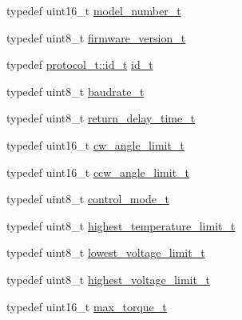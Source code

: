 \begin{DoxyCompactItemize}
\item 
typedef uint16\+\_\+t \hyperlink{structdynamixel_1_1servos_1_1_model_traits_3_01_xl320_01_4_1_1_c_t_aacfc8eec67dfec7e83d7aebcfad8caf7}{model\+\_\+number\+\_\+t}
\item 
typedef uint8\+\_\+t \hyperlink{structdynamixel_1_1servos_1_1_model_traits_3_01_xl320_01_4_1_1_c_t_a09705200b7923d6290e1887f57583610}{firmware\+\_\+version\+\_\+t}
\item 
typedef \hyperlink{classdynamixel_1_1protocols_1_1_protocol2_a38d9cae72cd86213cca74e718c240429}{protocol\+\_\+t\+::id\+\_\+t} \hyperlink{structdynamixel_1_1servos_1_1_model_traits_3_01_xl320_01_4_1_1_c_t_a7198088e049557b59ff1ace206a593be}{id\+\_\+t}
\item 
typedef uint8\+\_\+t \hyperlink{structdynamixel_1_1servos_1_1_model_traits_3_01_xl320_01_4_1_1_c_t_a7404f29aac21de1cb5357b23dc06e82d}{baudrate\+\_\+t}
\item 
typedef uint8\+\_\+t \hyperlink{structdynamixel_1_1servos_1_1_model_traits_3_01_xl320_01_4_1_1_c_t_a11370bf1ecea307f9f5ffbbcff181c64}{return\+\_\+delay\+\_\+time\+\_\+t}
\item 
typedef uint16\+\_\+t \hyperlink{structdynamixel_1_1servos_1_1_model_traits_3_01_xl320_01_4_1_1_c_t_a319479d6017a4430b9e05e378de557e0}{cw\+\_\+angle\+\_\+limit\+\_\+t}
\item 
typedef uint16\+\_\+t \hyperlink{structdynamixel_1_1servos_1_1_model_traits_3_01_xl320_01_4_1_1_c_t_a09dffdec3328d3c045ff12373b25d895}{ccw\+\_\+angle\+\_\+limit\+\_\+t}
\item 
typedef uint8\+\_\+t \hyperlink{structdynamixel_1_1servos_1_1_model_traits_3_01_xl320_01_4_1_1_c_t_a563172c7945c1ac77119e6c76d3adc60}{control\+\_\+mode\+\_\+t}
\item 
typedef uint8\+\_\+t \hyperlink{structdynamixel_1_1servos_1_1_model_traits_3_01_xl320_01_4_1_1_c_t_a7dc8c5d096a90b9afc2000931d020af2}{highest\+\_\+temperature\+\_\+limit\+\_\+t}
\item 
typedef uint8\+\_\+t \hyperlink{structdynamixel_1_1servos_1_1_model_traits_3_01_xl320_01_4_1_1_c_t_a5dcff54fb03942d65c546117bf4e3050}{lowest\+\_\+voltage\+\_\+limit\+\_\+t}
\item 
typedef uint8\+\_\+t \hyperlink{structdynamixel_1_1servos_1_1_model_traits_3_01_xl320_01_4_1_1_c_t_ab7012a8706d9b353da37f4332a58aff5}{highest\+\_\+voltage\+\_\+limit\+\_\+t}
\item 
typedef uint16\+\_\+t \hyperlink{structdynamixel_1_1servos_1_1_model_traits_3_01_xl320_01_4_1_1_c_t_ab585a8275fa10ca3dd3e24491f90746f}{max\+\_\+torque\+\_\+t}

\end{DoxyCompactItemize}
